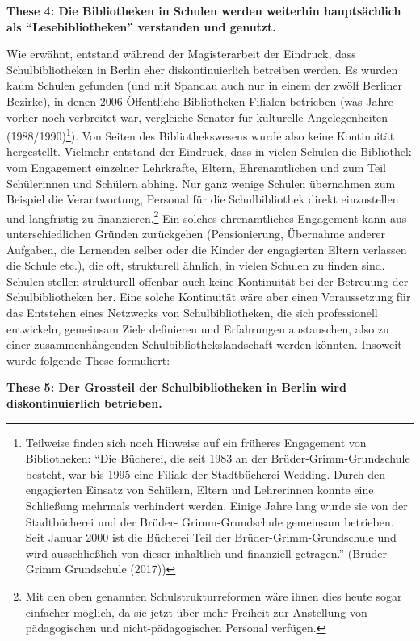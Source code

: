 \documentclass[a4paper,
fontsize=11pt,
oneside,
numbers=noperiodatend,
parskip=half-,
bibliography=totoc,
final
]{scrartcl}
\begin{document}
\textbf{These 4: Die Bibliotheken in Schulen werden weiterhin hauptsächlich als
\enquote{Lesebibliotheken} verstanden und genutzt.}

Wie erwähnt, entstand während der Magisterarbeit der Eindruck, dass
Schulbibliotheken in Berlin eher diskontinuierlich betreiben werden. Es
wurden kaum Schulen gefunden (und mit Spandau auch nur in einem der
zwölf Berliner Bezirke), in denen 2006 Öffentliche Bibliotheken Filialen
betrieben (was Jahre vorher noch verbreitet war, vergleiche Senator für
kulturelle Angelegenheiten (1988/1990)\footnote{Teilweise finden sich
  noch Hinweise auf ein früheres Engagement von Bibliotheken:
  \enquote{Die Bücherei, die seit 1983 an der Brüder-Grimm-Grundschule
  besteht, war bis 1995 eine Filiale der Stadtbücherei Wedding. Durch
  den engagierten Einsatz von Schülern, Eltern und Lehrerinnen konnte
  eine Schließung mehrmals verhindert werden. Einige Jahre lang wurde
  sie von der Stadtbücherei und der Brüder- Grimm-Grundschule gemeinsam
  betrieben. Seit Januar 2000 ist die Bücherei Teil der
  Brüder-Grimm-Grundschule und wird ausschließlich von dieser inhaltlich
  und finanziell getragen.} (Brüder Grimm Grundschule (2017))}). Von
Seiten des Bibliothekswesens wurde also keine Kontinuität hergestellt.
Vielmehr entstand der Eindruck, dass in vielen Schulen die Bibliothek
vom Engagement einzelner Lehrkräfte, Eltern, Ehrenamtlichen und zum Teil
Schülerinnen und Schülern abhing. Nur ganz wenige Schulen übernahmen zum
Beispiel die Verantwortung, Personal für die Schulbibliothek direkt
einzustellen und langfristig zu finanzieren.\footnote{Mit den oben
  genannten Schulstrukturreformen wäre ihnen dies heute sogar einfacher
  möglich, da sie jetzt über mehr Freiheit zur Anstellung von
  pädagogischen und nicht-pädagogischen Personal verfügen.} Ein solches
ehrenamtliches Engagement kann aus unterschiedlichen Gründen zurückgehen
(Pensionierung, Übernahme anderer Aufgaben, die Lernenden selber oder
die Kinder der engagierten Eltern verlassen die Schule etc.), die oft,
strukturell ähnlich, in vielen Schulen zu finden sind. Schulen stellen
strukturell offenbar auch keine Kontinuität bei der Betreuung der
Schulbibliotheken her. Eine solche Kontinuität wäre aber einen
Voraussetzung für das Entstehen eines Netzwerks von Schulbibliotheken,
die sich professionell entwickeln, gemeinsam Ziele definieren und
Erfahrungen austauschen, also zu einer zusammenhängenden
Schulbibliothekslandschaft werden könnten. Insoweit wurde folgende These
formuliert:

\textbf{These 5: Der Grossteil der Schulbibliotheken in Berlin wird
diskontinuierlich betrieben.}
\end{document}
